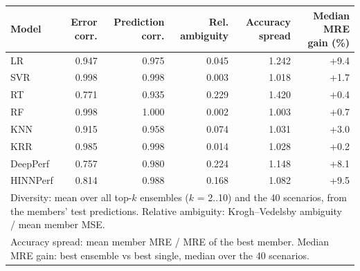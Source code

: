 \begin{tabular}{lrrrrr}
\toprule
Model & Error corr. & Prediction corr. & Rel. ambiguity & Accuracy spread & Median MRE gain (\%) \\
\midrule
LR & 0.947 & 0.975 & 0.045 & 1.242 & +9.4 \\
SVR & 0.998 & 0.998 & 0.003 & 1.018 & +1.7 \\
RT & 0.771 & 0.935 & 0.229 & 1.420 & +0.4 \\
RF & 0.998 & 1.000 & 0.002 & 1.003 & +0.7 \\
KNN & 0.915 & 0.958 & 0.074 & 1.031 & +3.0 \\
KRR & 0.985 & 0.998 & 0.014 & 1.028 & +0.2 \\
DeepPerf & 0.757 & 0.980 & 0.224 & 1.148 & +8.1 \\
HINNPerf & 0.814 & 0.988 & 0.168 & 1.082 & +9.5 \\
\bottomrule
\multicolumn{6}{l}{Diversity: mean over all top-$k$ ensembles ($k$ = 2..10) and the 40 scenarios, from the members' test predictions. Relative ambiguity: Krogh--Vedelsby ambiguity / mean member MSE.} \\
\multicolumn{6}{l}{Accuracy spread: mean member MRE / MRE of the best member. Median MRE gain: best ensemble vs best single, median over the 40 scenarios.} \\
\end{tabular}

